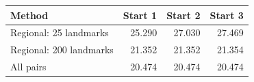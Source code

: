 \begin{tabular}{lrrr}
\toprule
Method & Start 1 & Start 2 & Start 3 \\
\midrule
Regional: 25 landmarks & 25.290 & 27.030 & 27.469 \\
Regional: 200 landmarks & 21.352 & 21.352 & 21.354 \\
All pairs & 20.474 & 20.474 & 20.474 \\
\bottomrule
\end{tabular}
